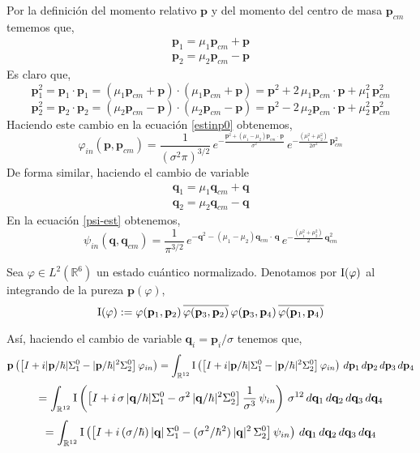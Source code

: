 \documentclass[12pt]{book}
\numberwithin{equation}{chapter}
\def\v{\mathbf}
\def\q{\mathbf{q}}
\def\n{\noindent}
\def\ol{\overline}
\def\R{\mathbb{R}}
\def\I{\hbox{I}}
\def\vp{\varphi}
\def\P{\mathbf{p}}
\begin{document}
Por la definici\'on del momento relativo $\P$ y del momento del centro de masa $\P_{cm}$ tememos que,
\begin{subequations}\label{p1-p2-p-pcm}
\begin{align}
\P_{1}= \mu_{1} \P_{cm} + \P\\
\P_{2}= \mu_{2} \P_{cm} - \P
\end{align}
\end{subequations}
Es claro que,
$$ \P_{1}^{2} = \P_{1} \cdot \P_{1}=(\mu_{1} \P_{cm} + \P) \cdot (\mu_{1} \P_{cm} + \P)= \P^{2}+2\, \mu_{1} \P_{cm} \cdot \P + \mu_{1}^{2}\, \P_{cm}^{2}  $$
$$ \P_{2}^{2} = \P_{2} \cdot \P_{2}=(\mu_{2} \P_{cm} - \P) \cdot (\mu_{2} \P_{cm} - \P)= \P^{2}-2\, \mu_{2} \P_{cm} \cdot \P + \mu_{2}^{2}\, \P_{cm}^{2} $$
Haciendo este cambio en la ecuaci\'on \eqref{estinp0} obtenemos,
\begin{equation}\label{estinpcm}
\vp_{in}(\P,\P_{cm})= \frac{1}{(\sigma^{2} \pi)^{3/2}} \, e^{-\frac{\P^{2}+(\mu_{1}-\mu_{2}) \P_{cm}\cdot \, \P}{\sigma^{2}} } \, e^{ -\frac{(\mu_{1}^{2}+\mu_{2}^{2} ) }{2 \sigma^{2}}\,\P_{cm}^{2} }
\end{equation}
De forma similar, haciendo el cambio de variable
\begin{subequations}\label{q1-q2-q-qcm}
\begin{align}
\v{q}_{1}= \mu_{1} \v{q}_{cm} + \v{q}\\
\v{q}_{2}= \mu_{2} \v{q}_{cm} - \v{q}
\end{align}
\end{subequations}
En la ecuaci\'on \eqref{psi-est} obtenemos,
\begin{equation}\label{estinqcm}
\psi_{in}(\q,\q_{cm})= \frac{1}{\pi^{3/2}} \, e^{-\v{q}^{2}-(\mu_{1}-\mu_{2}) \v{q}_{cm}\cdot\, \v{q} } \, e^{ -\frac{(\mu_{1}^{2}+\mu_{2}^{2} )}{2} \,\v{q}_{cm}^{2}}
\end{equation}

Sea $\vp \in L^{2}(\R^{6})$ un estado cu\'antico normalizado. Denotamos por $\I (\vp)$ al integrando de la pureza $\P(\vp)$,
\begin{equation}\label{intp}
\I(\vp) := \vp(\P_{1},\P_{2}) \, \ol{\vp(\P_{3},\P_{2})}\, \vp(\P_{3},\P_{4})\, \ol{\vp(\P_{1},\P_{4})}
\end{equation}

\n As\'i, haciendo el cambio de variable $\v{q}_{i}= \P_{i}/\sigma$ tenemos que,
$$ \P \left( \left[I + i|\P/\hbar| \Sigma_{1}^{0} - |\P/\hbar|^{2} \Sigma_{2}^{0} \right] \vp_{in} \right)= \int_{\R^{12}} \I \left( \left[I + i|\P/\hbar| \Sigma_{1}^{0} - |\P/\hbar|^{2} \Sigma_{2}^{0} \right] \vp_{in} \right) \, d\P_{1} \, d\P_{2}\, d\P_{3}\, d\P_{4} $$
$$= \int_{\R^{12}} \I \left( \left[I + i\, \sigma \,|\v{q}/\hbar| \Sigma_{1}^{0} -\sigma^{2}\, |\v{q}/\hbar|^{2} \Sigma_{2}^{0} \right]\frac{1}{\sigma^{3}}\, \psi_{in} \right) \, \sigma^{12}\, d\v{q}_{1} \, d\v{q}_{2}\, d\v{q}_{3}\, d\v{q}_{4} $$
\begin{equation}\label{Ppsi}
= \int_{\R^{12}} \I \left( \left[I + i\, (\sigma/\hbar)\, |\v{q}|\, \Sigma_{1}^{0} - (\sigma^{2}/\hbar^{2})\, |\v{q}|^{2} \, \Sigma_{2}^{0} \right] \psi_{in} \right) \, d\v{q}_{1} \, d\v{q}_{2}\, d\v{q}_{3}\, d\v{q}_{4}
\end{equation}
\end{document}

